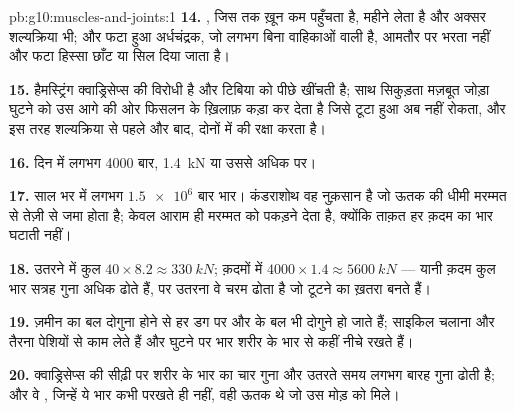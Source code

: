 \begin{solution}{pb:g10:muscles-and-joints:1}
\textbf{14.} , जिस तक ख़ून कम पहुँचता है, महीने लेता है और अक्सर
शल्यक्रिया भी; और फटा हुआ अर्धचंद्रक, जो लगभग बिना वाहिकाओं वाली 
है, आमतौर पर भरता नहीं और फटा हिस्सा छाँट या सिल दिया जाता है।

\textbf{15.} हैमस्ट्रिंग क्वाड्रिसेप्स की विरोधी है और टिबिया को पीछे
खींचती है; साथ सिकुड़ता मज़बूत जोड़ा घुटने को उस आगे की ओर फिसलन के
ख़िलाफ़ कड़ा कर देता है जिसे टूटा हुआ  अब नहीं रोकता, और इस तरह
शल्यक्रिया से पहले और बाद, दोनों में  की रक्षा करता है।

\textbf{16.} दिन में लगभग 4000 बार, \qty{1.4}{kN} या उससे अधिक पर।

\textbf{17.} साल भर में लगभग $\num{1.5e6}$ बार भार। कंडराशोथ वह नुक़सान
है जो  ऊतक की धीमी मरम्मत से तेज़ी से जमा होता है; केवल आराम ही
मरम्मत को पकड़ने देता है, क्योंकि ताक़त हर क़दम का भार घटाती नहीं।

\textbf{18.} उतरने में कुल $40 \times 8.2 \approx \qty{330}{kN}$;
क़दमों में $4000 \times 1.4 \approx \qty{5600}{kN}$ --- यानी क़दम कुल भार
सत्रह गुना अधिक ढोते हैं, पर उतरना वे चरम ढोता है जो टूटने का ख़तरा बनते
हैं।

\textbf{19.} ज़मीन का बल दोगुना होने से हर डग पर  और  के बल भी
दोगुने हो जाते हैं; साइकिल चलाना और तैरना पेशियों से काम लेते हैं और
घुटने पर भार शरीर के भार से कहीं नीचे रखते हैं।

\textbf{20.} क्वाड्रिसेप्स की  सीढ़ी पर शरीर के भार का चार गुना और
उतरते समय लगभग बारह गुना ढोती है; और वे , जिन्हें ये भार कभी परखते
ही नहीं, वही ऊतक थे जो उस मोड़ को मिले।
\end{solution}
